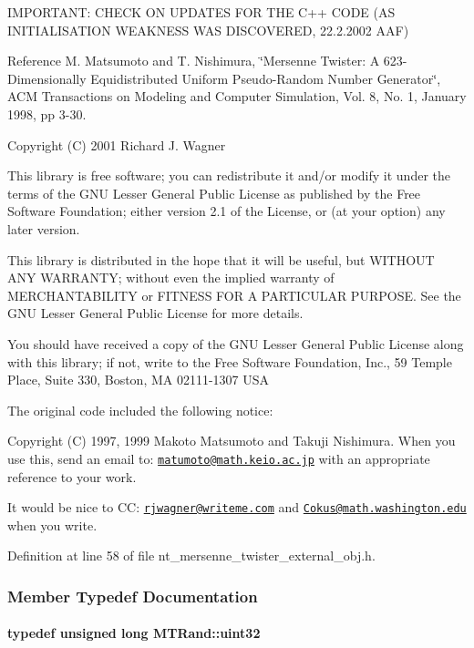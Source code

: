 IMPORTANT: CHECK ON UPDATES FOR THE C++ CODE (AS INITIALISATION WEAKNESS WAS DISCOVERED, 22.2.2002 AAF)

Reference M. Matsumoto and T. Nishimura, \char`\"{}Mersenne Twister: A 623-\/Dimensionally
 Equidistributed Uniform Pseudo-\/Random Number Generator\char`\"{}, ACM Transactions on Modeling and Computer Simulation, Vol. 8, No. 1, January 1998, pp 3-\/30.

Copyright (C) 2001 Richard J. Wagner

This library is free software; you can redistribute it and/or modify it under the terms of the GNU Lesser General Public License as published by the Free Software Foundation; either version 2.1 of the License, or (at your option) any later version.

This library is distributed in the hope that it will be useful, but WITHOUT ANY WARRANTY; without even the implied warranty of MERCHANTABILITY or FITNESS FOR A PARTICULAR PURPOSE. See the GNU Lesser General Public License for more details.

You should have received a copy of the GNU Lesser General Public License along with this library; if not, write to the Free Software Foundation, Inc., 59 Temple Place, Suite 330, Boston, MA 02111-\/1307 USA

The original code included the following notice:

Copyright (C) 1997, 1999 Makoto Matsumoto and Takuji Nishimura. When you use this, send an email to: \href{mailto:matumoto@math.keio.ac.jp}{\tt matumoto@math.keio.ac.jp} with an appropriate reference to your work.

It would be nice to CC: \href{mailto:rjwagner@writeme.com}{\tt rjwagner@writeme.com} and \href{mailto:Cokus@math.washington.edu}{\tt Cokus@math.washington.edu} when you write. 

Definition at line 58 of file nt\_\-mersenne\_\-twister\_\-external\_\-obj.h.



\subsubsection{Member Typedef Documentation}
\paragraph[{uint32}]{\setlength{\rightskip}{0pt plus 5cm}typedef unsigned long {\bf MTRand::uint32}}\hfill\label{class_m_t_rand_a45478edf9e24dcd2a5164bac3889d6a2}



